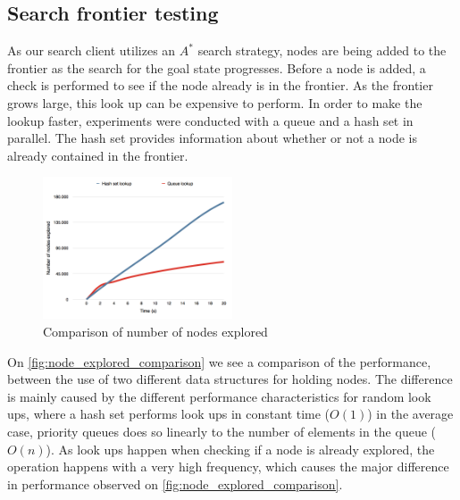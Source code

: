\documentclass[Main]{subfiles}
\begin{document}

\subsection{Search frontier testing}
As our search client utilizes an $A^*$ search strategy, nodes are being added to
the frontier as the search for the goal state progresses. Before a node is
added, a check is performed to see if the node already is in the frontier. As
the frontier grows large, this look up can be expensive to perform. In order to
make the lookup faster, experiments were conducted with a queue and a hash set
in parallel. The hash set provides information about whether or not a node is
already contained in the frontier.

\begin{figure}[h!]
    \centering
    \includegraphics[width=0.5\textwidth]{nodes_explored_compare.png}
    \caption{Comparison of number of nodes explored}
    \label{fig:node_explored_comparison}
\end{figure}


On \autoref{fig:node_explored_comparison} we see a comparison of the
performance, between the use of two different data structures for holding nodes. 
The difference is mainly caused by the different performance characteristics for
random look ups, 
where a hash set performs look ups in constant time ($O(1)$) in the average
case, priority queues does so linearly to the number of elements in the queue
($O(n)$). As look ups happen when checking if a node is already explored, the
operation happens with a very high frequency, which causes the major difference
in performance observed on \autoref{fig:node_explored_comparison}.
\end{document}
